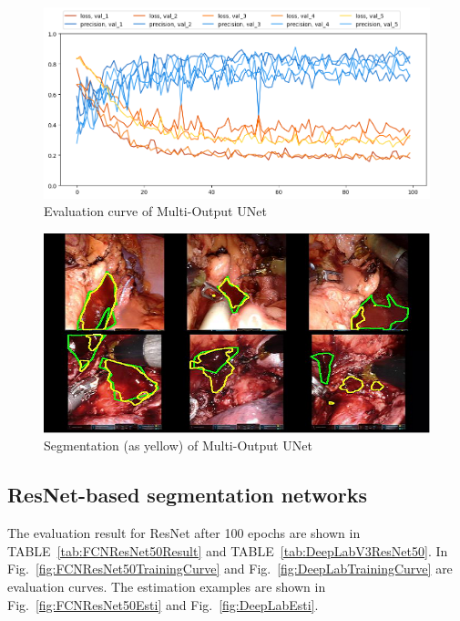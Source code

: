 \documentclass[10pt,journal,compsoc]{IEEEtran}
\begin{document}
\begin{figure}[h]
  \centering
  \includegraphics[width=\linewidth]{img/trainingCurve_MultiUNet.png}
  \caption{Evaluation curve of Multi-Output UNet}
  \label{fig:MultiOutUNetTrainingCurve}
\end{figure}

\begin{figure}[h]
  \centering
  \includegraphics[width=\linewidth]{img/Estimation_output_MultiOut_UNet.png}
  \caption{Segmentation (as yellow) of Multi-Output UNet}
  \label{fig:MultiOutUNetEsti}
\end{figure}

\subsection{ResNet-based segmentation networks}
The evaluation result for ResNet after 100 epochs are shown in TABLE~\ref{tab:FCNResNet50Result} and TABLE~\ref{tab:DeepLabV3ResNet50}. 
In Fig.~\ref{fig:FCNResNet50TrainingCurve} and Fig.~\ref{fig:DeepLabTrainingCurve} are evaluation curves.
The estimation examples are shown in Fig.~\ref{fig:FCNResNet50Esti} and Fig.~\ref{fig:DeepLabEsti}.
\end{document}
